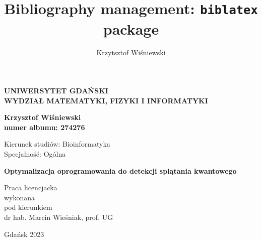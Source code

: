\documentclass[10pt, a4paper]{article}
\title{Bibliography
management:
\texttt{biblatex}
package}
\author{Krzytsztof
Wiśniewski}
\date{
}
\begin{document}
  \begin{titlepage}
    \centering


    \Large \textbf{UNIWERSYTET GDAŃSKI}\\ \textbf{WYDZIAŁ MATEMATYKI, FIZYKI I
    INFORMATYKI}

    \vspace{2.5cm}


    \large \textbf{Krzysztof Wiśniewski}\\ \textbf{numer albumu: 274276}

    \vspace{1.5cm}
    \raggedright \small Kierunek studiów: Bioinformatyka\\ Specjalność: Ogólna

    \vspace{1.5cm}


    \centering
    \Large \textbf{Optymalizacja oprogramowania do detekcji splątania kwantowego}

    \vfill


    \raggedleft \normalsize Praca licencjacka\\ wykonana\\ pod kierunkiem\\ dr hab. Marcin
    Wieśniak, prof. UG\\

    \vfill


    \centering
    \large Gdańsk 2023
  \end{titlepage}
  \newpage


  \tableofcontents
  \newpage
\end{document}
